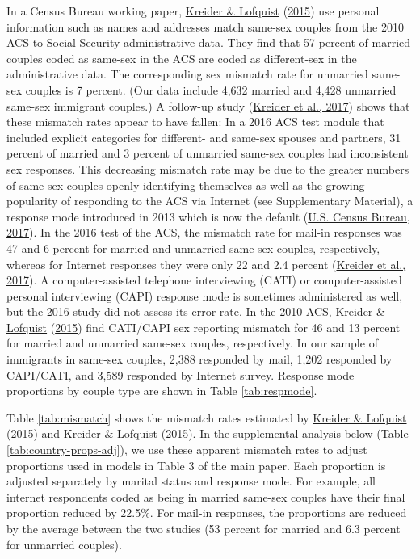 \documentclass[
  11pt,
]{article}
\begin{document}
In a Census Bureau working paper, \protect\hyperlink{ref-kreider_2015}{Kreider \& Lofquist} (\protect\hyperlink{ref-kreider_2015}{2015}) use personal information such as names and addresses match same-sex couples from the 2010 ACS to Social Security administrative data. They find that 57 percent of married couples coded as same-sex in the ACS are coded as different-sex in the administrative data. The corresponding sex mismatch rate for unmarried same-sex couples is 7 percent. (Our data include 4,632 married and 4,428 unmarried same-sex immigrant couples.) A follow-up study (\protect\hyperlink{ref-kreider_2017}{Kreider et al., 2017}) shows that these mismatch rates appear to have fallen: In a 2016 ACS test module that included explicit categories for different- and same-sex spouses and partners, 31 percent of married and 3 percent of unmarried same-sex couples had inconsistent sex responses. This decreasing mismatch rate may be due to the greater numbers of same-sex couples openly identifying themselves as well as the growing popularity of responding to the ACS via Internet (see Supplementary Material), a response mode introduced in 2013 which is now the default (\protect\hyperlink{ref-u.s.censusbureau_2017}{U.S. Census Bureau, 2017}). In the 2016 test of the ACS, the mismatch rate for mail-in responses was 47 and 6 percent for married and unmarried same-sex couples, respectively, whereas for Internet responses they were only 22 and 2.4 percent (\protect\hyperlink{ref-kreider_2017}{Kreider et al., 2017}). A computer-assisted telephone interviewing (CATI) or computer-assisted personal interviewing (CAPI) response mode is sometimes administered as well, but the 2016 study did not assess its error rate. In the 2010 ACS, \protect\hyperlink{ref-kreider_2015}{Kreider \& Lofquist} (\protect\hyperlink{ref-kreider_2015}{2015}) find CATI/CAPI sex reporting mismatch for 46 and 13 percent for married and unmarried same-sex couples, respectively. In our sample of immigrants in same-sex couples, 2,388 responded by mail, 1,202 responded by CAPI/CATI, and 3,589 responded by Internet survey. Response mode proportions by couple type are shown in Table \ref{tab:respmode}.

Table \ref{tab:mismatch} shows the mismatch rates estimated by \protect\hyperlink{ref-kreider_2015}{Kreider \& Lofquist} (\protect\hyperlink{ref-kreider_2015}{2015}) and \protect\hyperlink{ref-kreider_2015}{Kreider \& Lofquist} (\protect\hyperlink{ref-kreider_2015}{2015}). In the supplemental analysis below (Table \ref{tab:country-props-adj}), we use these apparent mismatch rates to adjust proportions used in models in Table 3 of the main paper. Each proportion is adjusted separately by marital status and response mode. For example, all internet respondents coded as being in married same-sex couples have their final proportion reduced by 22.5\%. For mail-in responses, the proportions are reduced by the average between the two studies (53 percent for married and 6.3 percent for unmarried couples).
\end{document}
